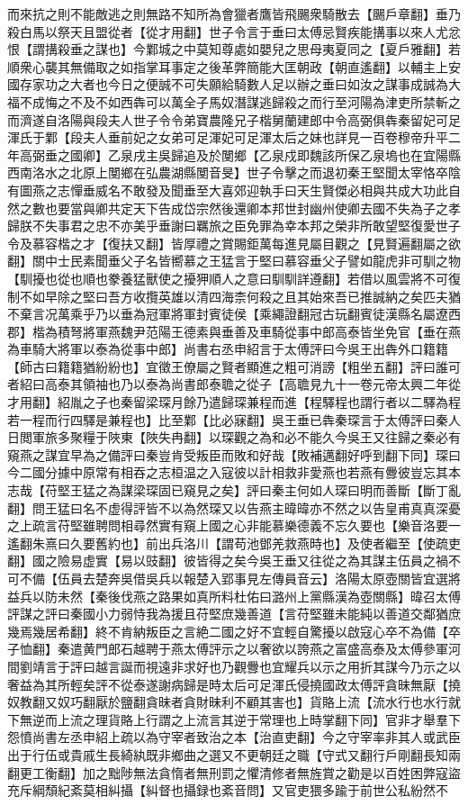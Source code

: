 而來抗之則不能敵逃之則無路不知所為會獵者鷹皆飛颺衆騎散去【颺戶章翻】垂乃殺白馬以祭天且盟從者【從才用翻】世子令言于垂曰太傅忌賢疾能搆事以來人尤忿恨【謂搆殺垂之謀也】今鄴城之中莫知尊處如嬰兒之思母夷夏同之【夏戶雅翻】若順衆心襲其無備取之如指掌耳事定之後革弊簡能大匡朝政【朝直遙翻】以輔主上安國存家功之大者也今日之便誠不可失願給騎數人足以辦之垂曰如汝之謀事成誠為大福不成悔之不及不如西犇可以萬全子馬奴潛謀逃歸殺之而行至河陽為津吏所禁斬之而濟遂自洛陽與段夫人世子令令弟寶農隆兄子楷舅蘭建郎中令高弼俱犇秦留妃可足渾氏于鄴【段夫人垂前妃之女弟可足渾妃可足渾太后之妹也詳見一百卷穆帝升平二年高弼垂之國卿】乙泉戌主吳歸追及於閺鄉【乙泉戍即魏該所保乙泉塢也在宜陽縣西南洛水之北原上閺鄉在弘農湖縣閺音旻】世子令擊之而退初秦王堅聞太宰恪卒陰有圖燕之志憚垂威名不敢發及聞垂至大喜郊迎執手曰天生賢傑必相與共成大功此自然之數也要當與卿共定天下告成岱宗然後還卿本邦世封幽州使卿去國不失為子之孝歸朕不失事君之忠不亦美乎垂謝曰羈旅之臣免罪為幸本邦之榮非所敢望堅復愛世子令及慕容楷之才【復扶又翻】皆厚禮之賞賜鉅萬每進見屬目觀之【見賢遍翻屬之欲翻】關中士民素聞垂父子名皆嚮慕之王猛言于堅曰慕容垂父子譬如龍虎非可馴之物【馴擾也從也順也豢養猛獸使之擾狎順人之意曰馴馴詳遵翻】若借以風雲將不可復制不如早除之堅曰吾方收攬英雄以清四海柰何殺之且其始來吾已推誠納之矣匹夫猶不棄言况萬乘乎乃以垂為冠軍將軍封賓徒侯【乘繩證翻冠古玩翻賓徒漢縣名屬遼西郡】楷為積弩將軍燕魏尹范陽王德素與垂善及車騎從事中郎高泰皆坐免官【垂在燕為車騎大將軍以泰為從事中郎】尚書右丞申紹言于太傅評曰今吳王出犇外口籍籍【師古曰籍籍猶紛紛也】宜徵王僚屬之賢者顯進之粗可消謗【粗坐五翻】評曰誰可者紹曰高泰其領袖也乃以泰為尚書郎泰聸之從子【高聸見九十一卷元帝太興二年從才用翻】紹胤之子也秦留梁琛月餘乃遣歸琛兼程而進【程驛程也謂行者以二驛為程若一程而行四驛是兼程也】比至鄴【比必寐翻】吳王垂已犇秦琛言于太傅評曰秦人日閲軍旅多聚糧于陜東【陜失冉翻】以琛觀之為和必不能久今吳王又往歸之秦必有窺燕之謀宜早為之備評曰秦豈肯受叛臣而敗和好哉【敗補邁翻好呼到翻下同】琛曰今二國分據中原常有相吞之志桓温之入寇彼以計相救非愛燕也若燕有釁彼豈忘其本志哉【苻堅王猛之為謀梁琛固已窺見之矣】評曰秦主何如人琛曰明而善斷【斷丁亂翻】問王猛曰名不虚得評皆不以為然琛又以告燕主暐暐亦不然之以告皇甫真真深憂之上疏言苻堅雖聘問相尋然實有窺上國之心非能慕樂德義不忘久要也【樂音洛要一遙翻朱熹曰久要舊約也】前出兵洛川【謂苟池鄧羌救燕時也】及使者繼至【使疏吏翻】國之險易虚實【易以豉翻】彼皆得之矣今吳王垂又往從之為其謀主伍員之禍不可不備【伍員去楚奔吳借吳兵以報楚入郢事見左傳員音云】洛陽太原壺關皆宜選將益兵以防未然【秦後伐燕之路果如真所料杜佑曰潞州上黨縣漢為壺關縣】暐召太傅評謀之評曰秦國小力弱恃我為援且苻堅庶幾善道【言苻堅雖未能純以善道交鄰猶庶幾焉幾居希翻】終不肯納叛臣之言絶二國之好不宜輕自驚擾以啟寇心卒不為備【卒子恤翻】秦遣黄門郎石越聘于燕太傅評示之以奢欲以誇燕之富盛高泰及太傅參軍河間劉靖言于評曰越言誕而視遠非求好也乃觀釁也宜耀兵以示之用折其謀今乃示之以奢益為其所輕矣評不從泰遂謝病歸是時太后可足渾氏侵撓國政太傅評貪昧無厭【撓奴教翻又奴巧翻厭於鹽翻貪昧者貪財昧利不顧其害也】貨賂上流【流水行也水行就下無逆而上流之理貨賂上行謂之上流言其逆于常理也上時掌翻下同】官非才舉羣下怨憤尚書左丞申紹上疏以為守宰者致治之本【治直吏翻】今之守宰率非其人或武臣出于行伍或貴戚生長綺紈既非鄉曲之選又不更朝廷之職【守式又翻行戶剛翻長知兩翻更工衡翻】加之黜陟無法貪惰者無刑罰之懼清修者無旌賞之勸是以百姓困弊寇盜充斥綱頹紀紊莫相糾攝【糾督也攝録也紊音問】又官吏猥多踰于前世公私紛然不